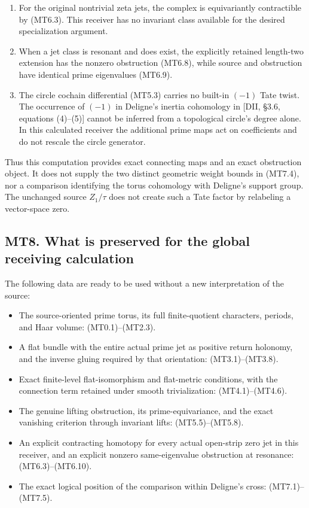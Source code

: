 \begin{enumerate}
\def\labelenumi{\arabic{enumi}.}
\tightlist
\item
  For the original nontrivial zeta jets, the complex is equivariantly
  contractible by (MT6.3). This receiver has no invariant class
  available for the desired specialization argument.
\item
  When a jet class is resonant and does exist, the explicitly retained
  length-two extension has the nonzero obstruction (MT6.8), while source
  and obstruction have identical prime eigenvalues (MT6.9).
\item
  The circle cochain differential (MT5.3) carries no built-in \((-1)\)
  Tate twist. The occurrence of \((-1)\) in Deligne's inertia cohomology
  in {[}DII, §3.6, equations (4)--(5){]} cannot be inferred from a
  topological circle's degree alone. In this calculated receiver the
  additional prime maps act on coefficients and do not rescale the
  circle generator.
\end{enumerate}

Thus this computation provides exact connecting maps and an exact
obstruction object. It does not supply the two distinct geometric weight
bounds in (MT7.4), nor a comparison identifying the torus cohomology
with Deligne's support group. The unchanged source \(Z_1/\tau\) does not
create such a Tate factor by relabeling a vector-space zero.

\subsection{MT8. What is preserved for the global receiving
calculation}\label{mt8.-what-is-preserved-for-the-global-receiving-calculation}

The following data are ready to be used without a new interpretation of
the source:

\begin{itemize}
\tightlist
\item
  The source-oriented prime torus, its full finite-quotient characters,
  periods, and Haar volume: (MT0.1)--(MT2.3).
\item
  A flat bundle with the entire actual prime jet as positive return
  holonomy, and the inverse gluing required by that orientation:
  (MT3.1)--(MT3.8).
\item
  Exact finite-level flat-isomorphism and flat-metric conditions, with
  the connection term retained under smooth trivialization:
  (MT4.1)--(MT4.6).
\item
  The genuine lifting obstruction, its prime-equivariance, and the exact
  vanishing criterion through invariant lifts: (MT5.5)--(MT5.8).
\item
  An explicit contracting homotopy for every actual open-strip zero jet
  in this receiver, and an explicit nonzero same-eigenvalue obstruction
  at resonance: (MT6.3)--(MT6.10).
\item
  The exact logical position of the comparison within Deligne's cross:
  (MT7.1)--(MT7.5).
\end{itemize}

